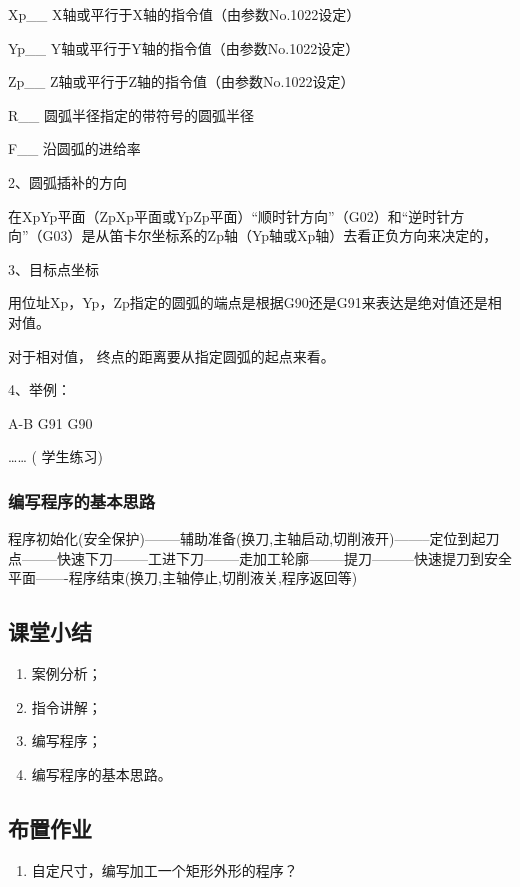 Xp\_\_	X轴或平行于X轴的指令值（由参数No.1022设定）

Yp\_\_	Y轴或平行于Y轴的指令值（由参数No.1022设定）

Zp\_\_	Z轴或平行于Z轴的指令值（由参数No.1022设定）

R\_\_	圆弧半径指定的带符号的圆弧半径

F\_\_	沿圆弧的进给率 



2、圆弧插补的方向

在XpYp平面（ZpXp平面或YpZp平面）“顺时针方向”（G02）和“逆时针方向”（G03）是从笛卡尔坐标系的Zp轴（Yp轴或Xp轴）去看正负方向来决定的，

3、目标点坐标

用位址Xp，Yp，Zp指定的圆弧的端点是根据G90还是G91来表达是绝对值还是相对值。

对于相对值， 终点的距离要从指定圆弧的起点来看。

4、举例：

A-B   G91   G90 

……   ( 学生练习)




\subsubsection{编写程序的基本思路}
程序初始化(安全保护)--------辅助准备(换刀,主轴启动,切削液开)--------定位到起刀点--------快速下刀--------工进下刀--------走加工轮廓--------提刀---------快速提刀到安全平面-------程序结束(换刀,主轴停止,切削液关,程序返回等)
\subsection{课堂小结}
\begin{enumerate}[1、]
\item 案例分析；
\item 指令讲解；
\item 编写程序；
\item 编写程序的基本思路。
\end{enumerate}
\vfill
\subsection{布置作业}
\begin{enumerate}[1、]
	\item 自定尺寸，编写加工一个矩形外形的程序？
\end{enumerate}
\vfill